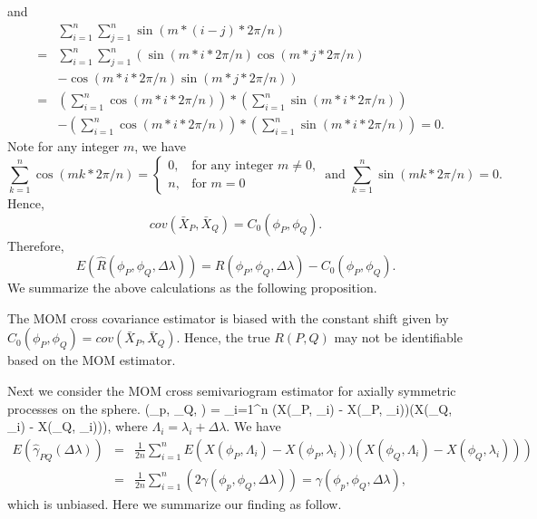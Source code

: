 and
			\begin{eqnarray*}
				& & \sum_{i = 1}^n \sum_{j=1}^n \sin(m*(i-j)*2\pi/n) \\
				&=& \sum_{i=1}^n \sum_{j=1}^n \left(\sin(m*i *2\pi/n)\cos(m*j*2\pi/n)\right. \\
				& & - \left.\cos(m*i *2\pi/n)\sin(m*j*2\pi/n) \right)\\
				&=& \left(\sum_{i=1}^n \cos(m*i *2\pi/n)\right)* \left(\sum_{i=1}^n \sin(m*i *2\pi/n)\right) \\
				& & - \left(\sum_{i=1}^n \cos(m*i *2\pi/n)\right)* \left(\sum_{i=1}^n \sin(m*i *2\pi/n)\right) = 0.
			\end{eqnarray*}
Note for any integer $m$, we have
			\[
				\sum_{k = 1}^{n} \cos(mk*2\pi/n) = \left\{\begin{array}{cc}
				0, & \mbox{for any integer $m \ne 0$,}  \\
				n, & \mbox{for $m = 0$}
				\end{array}
				\right. \mbox{ and }
				\sum_{k = 1}^{n} \sin(mk*2\pi/n) = 0.
			\]
Hence,
			\[
				cov(\bar{X}_P, \bar{X}_Q) = C_0 (\phi_P, \phi_Q).
			\]
Therefore,
			\[
				E(\hat{R}(\phi_P, \phi_Q, \Delta \lambda)) = R(\phi_P, \phi_Q, \Delta \lambda) - C_0 (\phi_P, \phi_Q).
			\]
We summarize the above calculations as the following proposition.
\begin{prop}
The MOM cross covariance estimator is biased with the constant shift given by $C_0(\phi_P, \phi_Q) = cov(\bar{X}_P, \bar{X}_Q)$. Hence, the true $R(P, Q)$ may not be identifiable based on the MOM estimator.  
\end{prop}

\vskip 8pt				
				

\vskip 8pt				


\vskip 8pt				

Next we consider the MOM cross semivariogram estimator for axially symmetric processes on the sphere.				
			\beq \label{cross_variogram}
			\hat{\gamma}(\phi_p, \phi_Q, \Delta\lambda) =  \sum_{i=1}^n \left(X(\phi_P, \Lambda_i) - X(\phi_P, \lambda_i))(X(\phi_Q, \Lambda_i) - X(\phi_Q, \lambda_i))\right),
			\eeq
where $\Lambda_i = \lambda_i+\Delta \lambda$. We have
			\begin{eqnarray*}
				E(\hat{\gamma}_{PQ}(\Delta \lambda)) &=& \frac{1}{2n} \sum_{i=1}^n E\left(X(\phi_P, \Lambda_i) - X(\phi_P, \lambda_i))(X(\phi_Q, \Lambda_i) - X(\phi_Q, \lambda_i))\right) \\
				&=& \frac{1}{2n} \sum_{i=1}^n \left( 2\gamma(\phi_p, \phi_Q, \Delta\lambda) \right) = \gamma(\phi_p, \phi_Q, \Delta\lambda),
			\end{eqnarray*}
			which is unbiased. Here we summarize our finding as follow.

